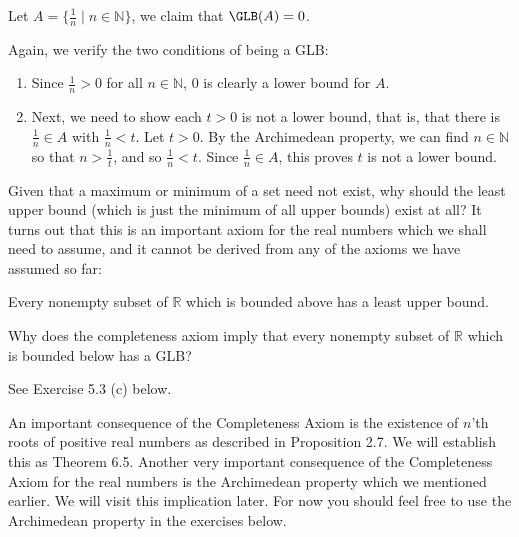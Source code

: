 \documentclass[11pt,dvipsnames]{book}
\numberwithin{figure}{section} %
\numberwithin{table}{section} %
\begin{document}
\begin{example}
Let $A=\{\frac{1}{n} \; | \; n\in\mathbb{N}\}$, we claim that $\GLB(A)=0$.

Again, we verify the two conditions of being a GLB:
\begin{enumerate}[label=(\alph*)]
\item Since $\frac{1}{n}>0$ for all $n\in\mathbb{N}$, $0$ is clearly a lower bound for $A$.
\item Next, we need to show each $t>0$ is not a lower bound, that is, that there is $\frac{1}{n} \in A$ with $\frac{1}{n}<t$. Let $t>0$. By the Archimedean property, we can find $n\in\mathbb{N}$ so that $n>\frac{1}{t}$, and so $\frac{1}{n}<t$. Since $\frac{1}{n}\in A$, this proves $t$ is not a lower bound.
\end{enumerate}
\end{example}

Given that a maximum or minimum of a set need not exist, why should the least upper bound (which is just the minimum of all upper bounds) exist at all? It turns out that this is an important axiom for the real numbers which we shall need to assume, and it cannot be derived from any of the axioms we have assumed so far:\\

\begin{tcolorbox}
{ Every nonempty subset of $\mathbb{R}$ which is bounded above has a least upper bound. \\}
\end{tcolorbox}

\begin{exercise}
Why does the completeness axiom imply that every nonempty subset of $\mathbb{R}$ which is bounded below has a GLB?
\begin{solution}
See Exercise 5.3 (c) below.
\end{solution}
\end{exercise}
An important consequence of the Completeness Axiom is the existence of $n$'th roots of positive real numbers as described in Proposition 2.7. We will establish this as Theorem 6.5. Another very important consequence of the Completeness Axiom for the real numbers is the Archimedean property which we mentioned earlier. We will visit this implication later. For now you should feel free to use the Archimedean property in the exercises below.
%
%
%
%
\end{document}

